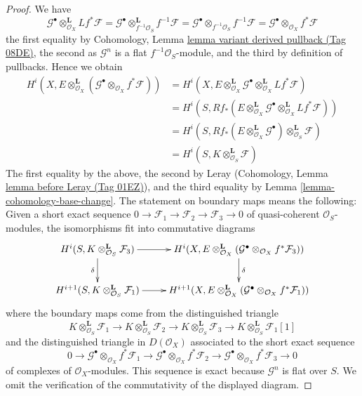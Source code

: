 \documentclass{amsart}
\theoremstyle{plain}
\theoremstyle{definition}
\theoremstyle{remark}
\numberwithin{equation}{subsection}
\begin{document}
\begin{proof}
We have
$$
\mathcal{G}^\bullet \otimes_{\mathcal{O}_X}^\mathbf{L} Lf^*\mathcal{F} =
\mathcal{G}^\bullet \otimes_{f^{-1}\mathcal{O}_S}^\mathbf{L} f^{-1}\mathcal{F} =
\mathcal{G}^\bullet \otimes_{f^{-1}\mathcal{O}_S} f^{-1}\mathcal{F} =
\mathcal{G}^\bullet \otimes_{\mathcal{O}_X} f^*\mathcal{F}
$$
the first equality by
Cohomology, Lemma \href{https://stacks.math.columbia.edu/tag/08DE}{lemma variant derived pullback (Tag 08DE)},
the second as $\mathcal{G}^n$ is a flat $f^{-1}\mathcal{O}_S$-module, and
the third by definition of pullbacks. Hence we obtain
\begin{align*}
H^i(X, E \otimes^\mathbf{L}_{\mathcal{O}_X}
(\mathcal{G}^\bullet \otimes_{\mathcal{O}_X} f^*\mathcal{F}))
& =
H^i(X, E \otimes^\mathbf{L}_{\mathcal{O}_X} \mathcal{G}^\bullet
\otimes_{\mathcal{O}_X}^\mathbf{L} Lf^*\mathcal{F}) \\
& =
H^i(S,
Rf_*(E \otimes^\mathbf{L}_{\mathcal{O}_X} \mathcal{G}^\bullet
\otimes^\mathbf{L}_{\mathcal{O}_X} Lf^*\mathcal{F})) \\
& =
H^i(S, Rf_*(E \otimes^\mathbf{L}_{\mathcal{O}_X} \mathcal{G}^\bullet)
\otimes^\mathbf{L}_{\mathcal{O}_S} \mathcal{F}) \\
& =
H^i(S, K \otimes^\mathbf{L}_{\mathcal{O}_S} \mathcal{F}) 
\end{align*}
The first equality by the above, the second by Leray
(Cohomology, Lemma \href{https://stacks.math.columbia.edu/tag/01EZ}{lemma before Leray (Tag 01EZ)}), and
the third equality by Lemma \ref{lemma-cohomology-base-change}.
The statement on boundary maps means the following: Given a short
exact sequence $0 \to \mathcal{F}_1 \to \mathcal{F}_2 \to \mathcal{F}_3 \to 0$
of quasi-coherent $\mathcal{O}_S$-modules, the isomorphisms fit into
commutative diagrams
$$
\xymatrix{
H^i(S, K \otimes^\mathbf{L}_{\mathcal{O}_S} \mathcal{F}_3)
\ar[r] \ar[d]_\delta &
H^i(X, E \otimes^\mathbf{L}_{\mathcal{O}_X}
(\mathcal{G}^\bullet \otimes_{\mathcal{O}_X} f^*\mathcal{F}_3))
\ar[d]^\delta \\
H^{i + 1}(S, K \otimes^\mathbf{L}_{\mathcal{O}_S} \mathcal{F}_1)
\ar[r] &
H^{i + 1}(X, E \otimes^\mathbf{L}_{\mathcal{O}_X}
(\mathcal{G}^\bullet \otimes_{\mathcal{O}_X} f^*\mathcal{F}_1))
}
$$
where the boundary maps come from the distinguished triangle
$$
K \otimes^\mathbf{L}_{\mathcal{O}_S} \mathcal{F}_1 \to
K \otimes^\mathbf{L}_{\mathcal{O}_S} \mathcal{F}_2 \to
K \otimes^\mathbf{L}_{\mathcal{O}_S} \mathcal{F}_3 \to
K \otimes^\mathbf{L}_{\mathcal{O}_S} \mathcal{F}_1[1]
$$
and the distinguished triangle in $D(\mathcal{O}_X)$ associated to
the short exact sequence
$$
0 \to
\mathcal{G}^\bullet \otimes_{\mathcal{O}_X} f^*\mathcal{F}_1 \to
\mathcal{G}^\bullet \otimes_{\mathcal{O}_X} f^*\mathcal{F}_2 \to
\mathcal{G}^\bullet \otimes_{\mathcal{O}_X} f^*\mathcal{F}_3 \to 0
$$
of complexes of $\mathcal{O}_X$-modules.
This sequence is exact because $\mathcal{G}^n$ is flat over $S$.
We omit the verification of the commutativity of the displayed diagram.
\end{proof}
\end{document}
